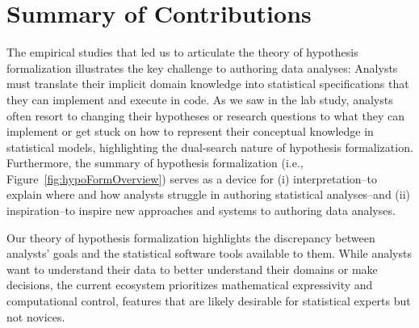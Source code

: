 











\section{Summary of Contributions}


The empirical studies that led us to articulate the theory of hypothesis
formalization illustrates the key challenge to authoring data analyses: Analysts
must translate their implicit domain knowledge into statistical specifications
that they can implement and execute in code. As we saw in the lab study,
analysts often resort to changing their hypotheses or research questions to what
they can implement or get stuck on how to represent their conceptual knowledge
in statistical models, highlighting the dual-search nature of hypothesis
formalization. Furthermore, the summary of hypothesis formalization (i.e.,
Figure~\ref{fig:hypoFormOverview}) serves as a device for (i) interpretation--to
explain where and how analysts struggle in authoring statistical analyses--and
(ii) inspiration--to inspire new approaches and systems to authoring data
analyses. 

Our theory of hypothesis formalization highlights the discrepancy between
analysts' goals and the statistical software tools available to them. While
analysts want to understand their data to better understand their domains or
make decisions, the current ecosystem prioritizes mathematical expressivity and
computational control, features that are likely desirable for statistical
experts but not novices. 

